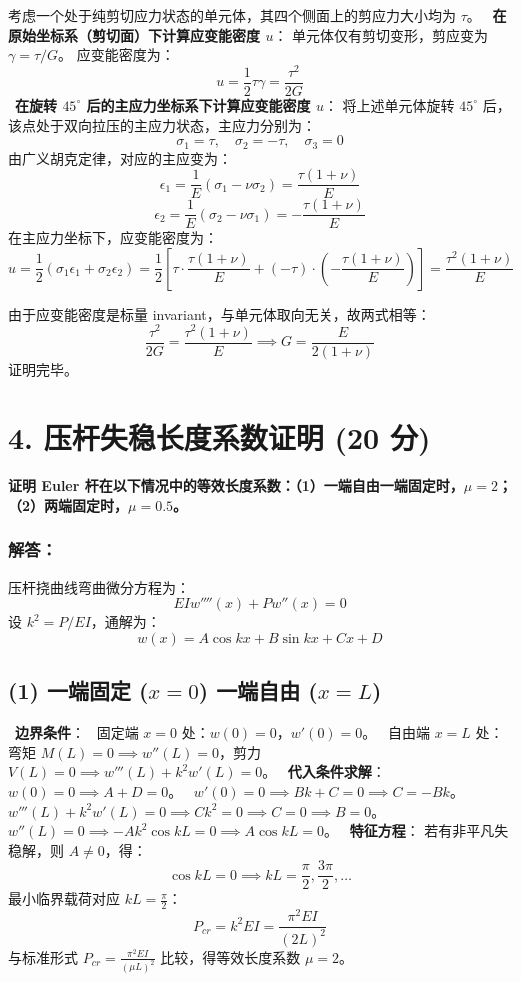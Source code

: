\documentclass[11pt,a4paper]{ctexrep}
\begin{document}
{考虑一个处于纯剪切应力状态的单元体，其四个侧面上的剪应力大小均为 $\tau$。
\noindent\textbullet\ \textbf{在原始坐标系（剪切面）下计算应变能密度 $u$}：
  单元体仅有剪切变形，剪应变为 $\gamma = \tau / G$。
  应变能密度为：
  \[
  u = \frac{1}{2} \tau \gamma = \frac{\tau^2}{2 G}
  \]
\noindent\textbullet\ \textbf{在旋转 $45^\circ$ 后的主应力坐标系下计算应变能密度 $u$}：
  将上述单元体旋转 $45^\circ$ 后，该点处于双向拉压的主应力状态，主应力分别为：
  \[
  \sigma_1 = \tau, \quad \sigma_2 = -\tau, \quad \sigma_3 = 0
  \]
  由广义胡克定律，对应的主应变为：
  \[
  \epsilon_1 = \frac{1}{E} (\sigma_1 - \nu \sigma_2) = \frac{\tau (1+\nu)}{E}
  \]
  \[
  \epsilon_2 = \frac{1}{E} (\sigma_2 - \nu \sigma_1) = -\frac{\tau (1+\nu)}{E}
  \]
  在主应力坐标下，应变能密度为：
  \[
  u = \frac{1}{2} (\sigma_1 \epsilon_1 + \sigma_2 \epsilon_2) = \frac{1}{2} \left[ \tau \cdot \frac{\tau (1+\nu)}{E} + (-\tau) \cdot \left(-\frac{\tau (1+\nu)}{E}\right) \right] = \frac{\tau^2 (1+\nu)}{E}
  \]

由于应变能密度是标量 invariant，与单元体取向无关，故两式相等：
\[
\frac{\tau^2}{2 G} = \frac{\tau^2 (1+\nu)}{E} \implies G = \frac{E}{2(1+\nu)}
\]
证明完毕。




\section*{4. 压杆失稳长度系数证明 (20 分)}

\textbf{证明 Euler 杆在以下情况中的等效长度系数：（1）一端自由一端固定时，$\mu = 2$；（2）两端固定时，$\mu = 0.5$。}

\subsubsection*{解答：}

压杆挠曲线弯曲微分方程为：
\[
EI w''''(x) + P w''(x) = 0
\]
设 $k^2 = P / EI$，通解为：
\[
w(x) = A \cos kx + B \sin kx + C x + D
\]

\subsection*{(1) 一端固定 ($x=0$) 一端自由 ($x=L$)}
\noindent\textbullet\ \textbf{边界条件}：
\noindent\textbullet\ 固定端 $x=0$ 处：$w(0) = 0$，$w'(0) = 0$。
\noindent\textbullet\ 自由端 $x=L$ 处：弯矩 $M(L) = 0 \implies w''(L) = 0$，剪力 $V(L) = 0 \implies w'''(L) + k^2 w'(L) = 0$。
\noindent\textbullet\ \textbf{代入条件求解}：
\noindent\textbullet\ $w(0) = 0 \implies A + D = 0$。
\noindent\textbullet\ $w'(0) = 0 \implies B k + C = 0 \implies C = -B k$。
\noindent\textbullet\ $w'''(L) + k^2 w'(L) = 0 \implies C k^2 = 0 \implies C = 0 \implies B = 0$。
\noindent\textbullet\ $w''(L) = 0 \implies -A k^2 \cos kL = 0 \implies A \cos kL = 0$。
\noindent\textbullet\ \textbf{特征方程}：
  若有非平凡失稳解，则 $A \neq 0$，得：
  \[
  \cos kL = 0 \implies kL = \frac{\pi}{2}, \frac{3\pi}{2}, \dots
  \]
  最小临界载荷对应 $kL = \frac{\pi}{2}$：
  \[
  P_{cr} = k^2 EI = \frac{\pi^2 EI}{(2L)^2}
  \]
  与标准形式 $P_{cr} = \frac{\pi^2 EI}{(\mu L)^2}$ 比较，得等效长度系数 $\mu = 2$。

}
\end{document}
